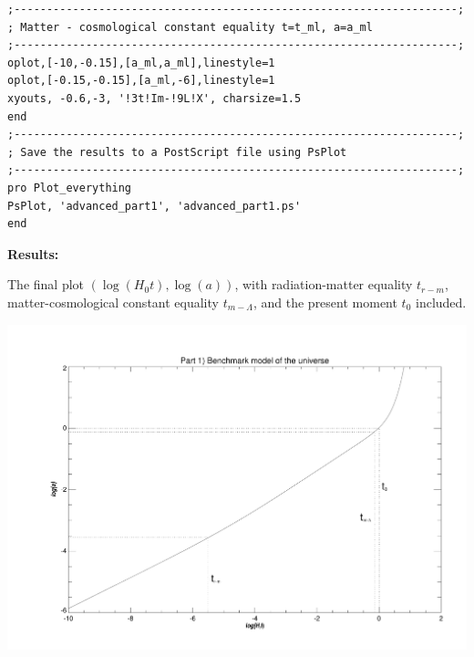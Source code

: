 \documentclass[a4paper,12pt]{article}
\begin{document}
\begin{itemize}
\begin{scriptsize}
\begin{verbatim}
;--------------------------------------------------------------------;
; Matter - cosmological constant equality t=t_ml, a=a_ml
;--------------------------------------------------------------------;
oplot,[-10,-0.15],[a_ml,a_ml],linestyle=1
oplot,[-0.15,-0.15],[a_ml,-6],linestyle=1
xyouts, -0.6,-3, '!3t!Im-!9L!X', charsize=1.5
end
;--------------------------------------------------------------------;
; Save the results to a PostScript file using PsPlot
;--------------------------------------------------------------------;
pro Plot_everything
PsPlot, 'advanced_part1', 'advanced_part1.ps'
end
\end{verbatim}
\end{scriptsize}


%

\vspace*{0.5cm}
\textbf{Results:}

The final plot $(\log(H_0 t),\log(a))$, with radiation-matter equality $t_{r-m}$, matter-cosmological constant equality $t_{m-\Lambda}$, and the present moment $t_0$ included.

\centerline{\includegraphics[scale=0.6]{advanced_part1.pdf}}%


\end{itemize}
\end{document}
